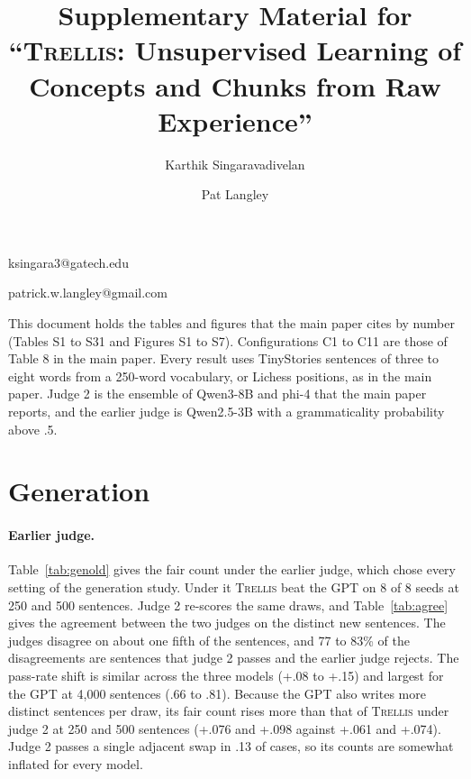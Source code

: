 \documentclass[11pt,letterpaper]{article}
\newcommand{\trellis}{\textsc{Trellis}}
\begin{document}
\raggedbottom

\title{Supplementary Material for ``\trellis{}: Unsupervised Learning of Concepts and Chunks from Raw Experience''}

\author{Karthik Singaravadivelan}{ksingara3@gatech.edu}
\author{Pat Langley}{patrick.w.langley@gmail.com}
\address{Georgia Institute of Technology, Atlanta, GA 30332 USA; \
         Institute for the Study of Learning and Expertise,
         2164 Staunton Court, Palo Alto, CA 94306 USA}


This document holds the tables and figures that the main paper cites by number (Tables S1 to S31 and Figures S1 to S7).
Configurations C1 to C11 are those of Table 8 in the main paper. Every result uses TinyStories sentences of three to eight words from a 250-word vocabulary, or Lichess positions, as in the main paper.
Judge 2 is the ensemble of Qwen3-8B and phi-4 that the main paper reports, and the earlier judge is Qwen2.5-3B with a grammaticality probability above .5.

\section{Generation}

\paragraph{Earlier judge.} Table~\ref{tab:genold} gives the fair count under the earlier judge, which chose every setting of the generation study.
Under it \trellis{} beat the GPT on 8 of 8 seeds at 250 and 500 sentences. Judge 2 re-scores the same draws, and Table~\ref{tab:agree} gives the agreement between the two judges on the distinct new sentences.
The judges disagree on about one fifth of the sentences, and 77 to 83\% of the disagreements are sentences that judge 2 passes and the earlier judge rejects.
The pass-rate shift is similar across the three models (+.08 to +.15) and largest for the GPT at 4,000 sentences (.66 to .81). Because the GPT also writes more distinct sentences per draw, its fair count rises more than that of \trellis{} under judge 2 at 250 and 500 sentences (+.076 and +.098 against +.061 and +.074).
Judge 2 passes a single adjacent swap in .13 of cases, so its counts are somewhat inflated for every model.
\end{document}
